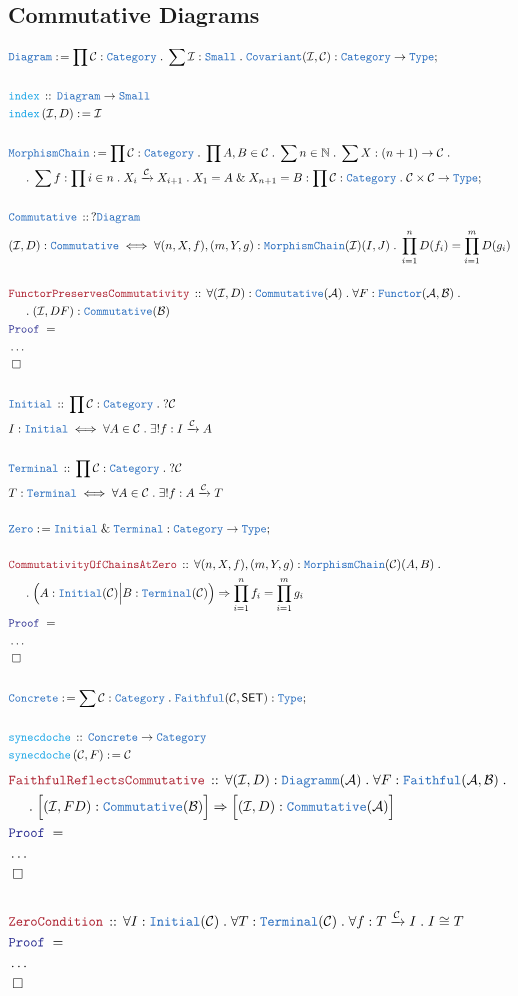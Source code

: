 \documentclass[12pt]{scrartcl}
\newcommand{\TYPE}[1]{\textcolor{NavyBlue}{\mathtt{#1}}}
\newcommand{\FUNC}[1]{\textcolor{Cerulean}{\mathtt{#1}}}
\newcommand{\LOGIC}[1]{\textcolor{Blue}{\mathtt{#1}}}
\newcommand{\THM}[1]{\textcolor{Maroon}{\mathtt{#1}}}
\renewcommand{\.}{\; . \;}
\newcommand{\de}{: \kern 0.1pc =}
\newcommand{\Act}[1]{\left( #1 \right)}
\newcommand{\Theorem}[2]{& \THM{#1} \, :: \, #2 \\ & \Proof = \\ }
\newcommand{\DeclareType}[2]{& \TYPE{#1} \, :: \, #2 \\}
\newcommand{\DefineType}[3]{& #1 : \TYPE{#2} \iff #3 \\}
\newcommand{\DeclareFunc}[2]{& \FUNC{#1} \, :: \, #2 \\}
\newcommand{\DefineFunc}[3]{&  \FUNC{#1}\Act{#2} \de #3 \\}
\newcommand{\NewLine}{\\ & \kern 1pc}
\newcommand{\Page}[1]{ \begin{align*} #1 \end{align*}   }
\newcommand{\NoProof}{ & \ldots \\ \EndProof}
\renewcommand{\And}{\; \& \;}
\newcommand{\Type}{\TYPE{Type}}
\newcommand{\Nat}{\mathbb{N} }
\newcommand{\Cat}{\TYPE{Category}}
\newcommand{\Arrow}{\xrightarrow}
\newcommand{\Conclude}[3]{& #1 \de #2 : #3; \\}
\newcommand{\QED}{\; \square}
\newcommand{\EndProof}{& \QED \\}
\newcommand{\Proof}{\LOGIC{Proof} \; }
\newcommand{\Cov}{\TYPE{Covariant}}
\newcommand{\C}{\mathcal{C}}
\newcommand{\A}{\mathcal{A}}
\newcommand{\B}{\mathcal{B}}
\newcommand{\I}{\mathcal{I}}
\newcommand{\SET}{\mathsf{SET}}
\begin{document}
\subsection{ Commutative Diagrams }
\Page{
	\Conclude{\TYPE{Diagram}}{ \prod \C : \Cat \. \sum \I : \TYPE{Small} \. \Cov(\I,\C) }{ \Cat \to \Type}
	\\
	\DeclareFunc{index}{ \TYPE{Diagram} \to \TYPE{Small}  }
	\DefineFunc{index}{\I,D}{\I}
	\\
	\Conclude{\TYPE{MorphismChain}}{ \prod \C : \Cat \. \prod A,B \in \C \. 
		\sum n \in \Nat \. \sum X : (n + 1) \to \C \. \NewLine \. 
		\sum f : \prod i \in n \.  X_i \Arrow{\C} X_{i+1}  \. X_1 = A \And X_{n+1} = B   }
		{\prod \C : \Cat  \. \C \times \C \to \Type }
	\\
	\DeclareType{Commutative}{?\TYPE{Diagram}}
	\DefineType{ (\I,D)  }{Commutative}{  \forall (n,X,f),(m,Y,g) : \TYPE{MorphismChain}(\I)(I,J) 
		\. \prod^n_{i=1} D(f_i) = \prod^m_{i=1}D(g_i)}
	\\
	\Theorem{FunctorPreservesCommutativity}{
		\forall (\I,D) : \TYPE{Commutative}(\A ) \.
		\forall F : \TYPE{Functor}(\A,\B) \. \NewLine \.
		  (\I,DF) : \TYPE{Commutative}(\B)
		}
	\NoProof
	\\
	\DeclareType{ Initial }{ \prod \C : \Cat \. ?\C}
	\DefineType{I}{Initial}{ \forall A \in \C \. \exists! f : I \Arrow{\C} A  }
	\\
	\DeclareType{Terminal}{\prod \C : \Cat \. ?\C}
	\DefineType{T}{Terminal}{\forall A \in \C \. \exists! f : A \Arrow{\C} T }
	\\
	\Conclude{\TYPE{Zero}}{\TYPE{Initial} \And \TYPE{Terminal} }{ \Cat \to \Type}
	\\
	\Theorem{CommutativityOfChainsAtZero}{\forall (n,X,f),(m,Y,g) : \TYPE{MorphismChain}(\C)(A,B) 
		\.  \NewLine \. \Big(A : \TYPE{Initial}(\C) \Big| B : \TYPE{Terminal}(\C)\Big) 
		\Rightarrow \prod^n_{i=1} f_i = \prod^m_{i=1} g_i     }
	\NoProof
	\\
	\Conclude{ \TYPE{Concrete} }{ \sum \C : \Cat \. \TYPE{Faithful}(\C,\SET)  }{ \Type  }
	\\
	\DeclareFunc{synecdoche}{\TYPE{Concrete} \to \Cat}
	\DefineFunc{synecdoche}{\C,F}{ \C  }
} \Page{
	\Theorem{FaithfulReflectsCommutative}{  
		\forall (\I,D) : \TYPE{Diagramm}(\A) \. \forall F : \TYPE{Faithful}(\A,\B) \. \NewLine \. 
		\Big[(\I,FD) : \TYPE{Commutative}(\B) \Big] \Rightarrow \Big[ (\I,D) : \TYPE{Commutative}(\A) \Big]  
		}
	\NoProof
	\\
	\Theorem{ZeroCondition}{
		\forall I : \TYPE{Initial}(\C) \. \forall T : \TYPE{Terminal}(\C) \.
		\forall f : T \Arrow{\C} I \. I \cong T
		}
		\NoProof
}
\newpage
\end{document}
